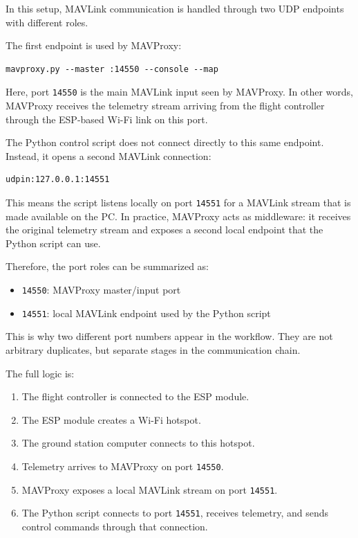 In this setup, MAVLink communication is handled through two UDP endpoints with different roles.

The first endpoint is used by MAVProxy:
\begin{verbatim}
mavproxy.py --master :14550 --console --map
\end{verbatim}

Here, port \texttt{14550} is the main MAVLink input seen by MAVProxy. In other words, MAVProxy receives the telemetry stream arriving from the flight controller through the ESP-based Wi-Fi link on this port.

The Python control script does not connect directly to this same endpoint. Instead, it opens a second MAVLink connection:

\begin{verbatim}
udpin:127.0.0.1:14551
\end{verbatim}

This means the script listens locally on port \texttt{14551} for a MAVLink stream that is made available on the PC. In practice, MAVProxy acts as middleware: it receives the original telemetry stream and exposes a second local endpoint that the Python script can use.

Therefore, the port roles can be summarized as:

\begin{itemize}
    \item \texttt{14550}: MAVProxy master/input port
    \item \texttt{14551}: local MAVLink endpoint used by the Python script
\end{itemize}

This is why two different port numbers appear in the workflow. They are not arbitrary duplicates, but separate stages in the communication chain.

The full logic is:

\begin{enumerate}
    \item The flight controller is connected to the ESP module.
    \item The ESP module creates a Wi-Fi hotspot.
    \item The ground station computer connects to this hotspot.
    \item Telemetry arrives to MAVProxy on port \texttt{14550}.
    \item MAVProxy exposes a local MAVLink stream on port \texttt{14551}.
    \item The Python script connects to port \texttt{14551}, receives telemetry, and sends control commands through that connection.
\end{enumerate}


